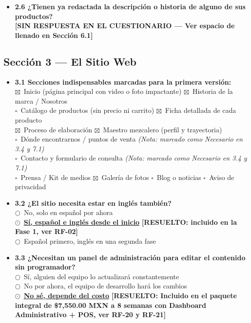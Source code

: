 \documentclass[11pt,letterpaper]{article}
\newcommand{\uchk}{$\square$}
\newcommand{\chk}{\textcolor{mezcalAgave}{$\boxtimes$}}
\newcommand{\uradio}{$\bigcirc$}
\newcommand{\radio}{\textcolor{mezcalAgave}{\textbf{$\odot$}}}
\begin{document}
\begin{itemize}[leftmargin=1.5em]
    \item \textbf{2.6 ¿Tienen ya redactada la descripción o historia de alguno de sus productos?}\\
    \textcolor{red!80!black}{\textbf{[SIN RESPUESTA EN EL CUESTIONARIO — Ver espacio de llenado en Sección 6.1]}}
\end{itemize}

\subsection{Sección 3 — El Sitio Web}
\begin{itemize}[leftmargin=1.5em]
    \item \textbf{3.1 Secciones indispensables marcadas para la primera versión:}\\
    \chk\ Inicio (página principal con video o foto impactante) \quad
    \chk\ Historia de la marca / Nosotros \\
    \uchk\ Catálogo de productos (sin precio ni carrito) \quad
    \chk\ Ficha detallada de cada producto \\
    \chk\ Proceso de elaboración \quad
    \chk\ Maestro mezcalero (perfil y trayectoria) \\
    \uchk\ Dónde encontrarnos / puntos de venta \textit{(Nota: marcado como Necesario en 3.4 y 7.1)} \\
    \uchk\ Contacto y formulario de consulta \textit{(Nota: marcado como Necesario en 3.4 y 7.1)} \\
    \uchk\ Prensa / Kit de medios \quad
    \chk\ Galería de fotos \quad
    \uchk\ Blog o noticias \quad
    \uchk\ Aviso de privacidad

    \item \textbf{3.2 ¿El sitio necesita estar en inglés también?}\\
    \uradio\ No, solo en español por ahora\\
    \radio\ \underline{\textbf{Sí, español e inglés desde el inicio}} \quad \textcolor{mezcalAgave}{\textbf{[RESUELTO: incluido en la Fase 1, ver RF-02]}}\\
    \uradio\ Español primero, inglés en una segunda fase

    \item \textbf{3.3 ¿Necesitan un panel de administración para editar el contenido sin programador?}\\
    \uradio\ Sí, alguien del equipo lo actualizará constantemente\\
    \uradio\ No por ahora, el equipo de desarrollo hará los cambios\\
    \radio\ \underline{\textbf{No sé, depende del costo}} \quad \textcolor{mezcalAgave}{\textbf{[RESUELTO: Incluido en el paquete integral de \$7,550.00 MXN a 8 semanas con Dashboard Administrativo + POS, ver RF-20 y RF-21]}}\


\end{itemize}
\end{document}
